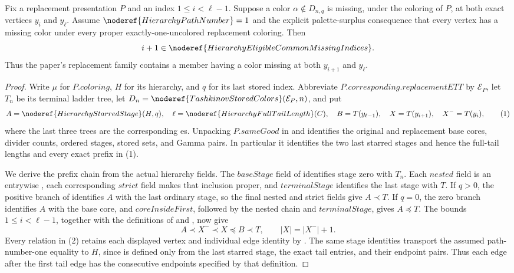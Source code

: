 \begin{lemma}
Fix a replacement presentation \(P\) and an index
\(1\leq i<\ell-1\).  Suppose a color \(\alpha\notin D_{n,q}\) is missing,
under the coloring of \(P\), at both exact vertices \(y_i\) and \(y_\ell\).
Assume \(\noderef{HierarchyPathNumber}=1\) and the explicit
palette-surplus consequence that every vertex has a missing color under
every proper exactly-one-uncolored replacement coloring.  Then
\[
 i+1\in\noderef{HierarchyEligibleCommonMissingIndices}.
\]
Thus the paper's replacement family contains a member having a color
missing at both \(y_{i+1}\) and \(y_\ell\).
\end{lemma}
\begin{proof}
Write \(\mu\) for \(P.\mathit{coloring}\), \(H\) for its hierarchy, and
\(q\) for its last stored index.  Abbreviate
\(P.\mathit{corresponding}.\mathit{replacementETT}\) by
\(\mathcal E_P\), let \(T_n\) be its terminal ladder tree, let
\(D_n=\noderef{TashkinovStoredColors}(\mathcal E_P,n)\), and put
\[
 A=\noderef{HierarchyStarredStage}(H,q),\quad
 \ell=\noderef{HierarchyFullTailLength}(C),\quad
 B=T(y_{\ell-1}),\quad X=T(y_{i+1}),\quad X^-=T(y_i),          \tag{1}
\]
where the last three trees are the corresponding
es.  Unpacking
\(P.\mathit{sameGood}\) in
 and
 identifies the original and replacement base
cores, divider counts, ordered stages, stored sets, and Gamma pairs.  In
particular it identifies the two last starred stages and hence the
full-tail lengths and every exact prefix in (1).

We derive the prefix chain from the actual hierarchy fields.  The
\(\mathit{baseStage}\) field of  identifies
stage zero with \(T_n\).  Each \(\mathit{nested}\) field is an entrywise
, each corresponding
\(\mathit{strict}\) field makes that inclusion proper, and
\(\mathit{terminalStage}\) identifies the last stage with \(T\).  If
\(q>0\), the positive branch of  identifies
\(A\) with the last ordinary stage, so the final nested and strict fields
give \(A\prec T\).  If \(q=0\), the zero branch identifies \(A\) with the
base core, and \(\mathit{coreInsideFirst}\), followed by the nested chain
and \(\mathit{terminalStage}\), gives \(A\preccurlyeq T\).  The bounds
\(1\le i<\ell-1\), together with the definitions of
 and
, now give
\[
 A\prec X^-\prec X\preccurlyeq B\prec T,\qquad
 |X|=|X^-|+1.                                                  \tag{2}
\]
Every relation in (2) retains each displayed vertex and individual edge
identity by .  The same stage
identities transport the assumed path-number-one equality to \(H\), since
 is defined only from the last starred stage,
the exact tail entries, and their endpoint pairs.  Thus each edge after
the first tail edge has the consecutive endpoints specified by that
definition.


\end{proof}
